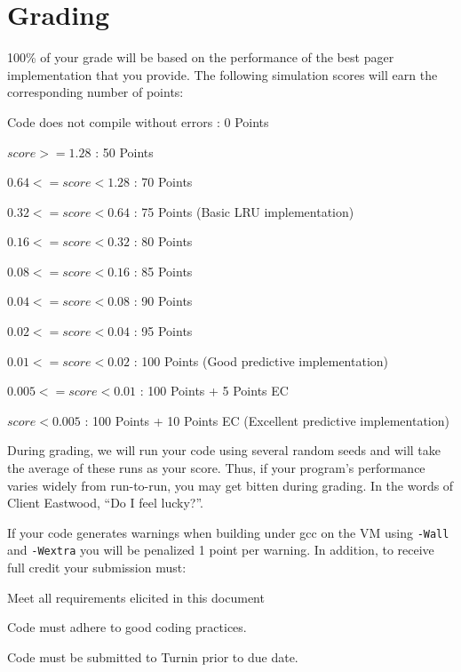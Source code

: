\documentclass[12pt]{article}
\newenvironment{packed_item}{
\begin{itemize}
  \setlength{\itemsep}{1pt}
  \setlength{\parskip}{0pt}
  \setlength{\parsep}{0pt}
}{\end{itemize}}
\begin{document}
\section{Grading}

100\% of your grade will be based on the performance of the
best pager implementation that you provide. The following simulation
scores will earn the corresponding number of points:
\begin{packed_item}
\item Code does not compile without errors : 0 Points
\item $score >= 1.28$ : 50 Points
\item $0.64 <= score < 1.28$ : 70 Points
\item $0.32 <= score < 0.64$ : 75 Points (Basic LRU implementation)
\item $0.16 <= score < 0.32$ : 80 Points
\item $0.08 <= score < 0.16$ : 85 Points
\item $0.04 <= score < 0.08$ : 90 Points
\item $0.02 <= score < 0.04$ : 95 Points
\item $0.01 <= score < 0.02$ : 100 Points (Good predictive implementation)
\item $0.005 <= score < 0.01$ : 100 Points + 5 Points EC
\item $score < 0.005$ : 100 Points + 10 Points EC (Excellent predictive implementation)
\end{packed_item}

During grading, we will run your code using several
random seeds and will take the average of these runs as your
score. Thus, if your program's performance varies widely from
run-to-run, you may get bitten during grading. In the words of
Client Eastwood, ``Do I feel lucky?''.

If your code generates warnings when building under gcc on the VM
using \texttt{-Wall} and \texttt{-Wextra} you will be penalized 1
point per warning. In addition, to receive full credit your submission must:
\begin{packed_item}
\item Meet all requirements elicited in this document
\item Code must adhere to good coding practices.
\item Code must be submitted to Turnin prior to due date.
\end{packed_item}
\end{document}
